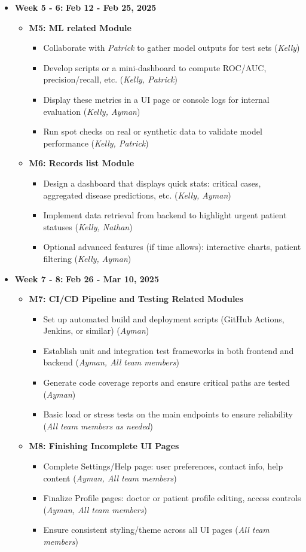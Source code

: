\documentclass[12pt, titlepage]{article}
\newcommand{\rt}[1]{\textbf{#1}}
\begin{document}
\begin{itemize}
\item \textbf{Week 5 - 6:} \rt{Feb 12 - Feb 25, 2025} \begin{itemize} \item \textbf{M5: ML related Module} \begin{itemize} \item Collaborate with \textit{Patrick} to gather model outputs for test sets (\textit{Kelly}) \item Develop scripts or a mini-dashboard to compute ROC/AUC, precision/recall, etc. (\textit{Kelly, Patrick}) \item Display these metrics in a UI page or console logs for internal evaluation (\textit{Kelly, Ayman}) \item Run spot checks on real or synthetic data to validate model performance (\textit{Kelly, Patrick}) \end{itemize} \item \textbf{M6: Records list Module} \begin{itemize} \item Design a dashboard that displays quick stats: critical cases, aggregated disease predictions, etc. (\textit{Kelly, Ayman}) \item Implement data retrieval from backend to highlight urgent patient statuses (\textit{Kelly, Nathan}) \item Optional advanced features (if time allows): interactive charts, patient filtering (\textit{Kelly, Ayman}) \end{itemize} \end{itemize}

\item \textbf{Week 7 - 8:} \rt{Feb 26 - Mar 10, 2025} \begin{itemize} \item \textbf{M7: CI/CD Pipeline and Testing Related Modules} \begin{itemize} \item Set up automated build and deployment scripts (GitHub Actions, Jenkins, or similar) (\textit{Ayman}) \item Establish unit and integration test frameworks in both frontend and backend (\textit{Ayman, All team members}) \item Generate code coverage reports and ensure critical paths are tested (\textit{Ayman}) \item Basic load or stress tests on the main endpoints to ensure reliability (\textit{All team members as needed}) \end{itemize} \item \textbf{M8: Finishing Incomplete UI Pages} \begin{itemize} \item Complete Settings/Help page: user preferences, contact info, help content (\textit{Ayman, All team members}) \item Finalize Profile pages: doctor or patient profile editing, access controls (\textit{Ayman, All team members}) \item Ensure consistent styling/theme across all UI pages (\textit{All team members}) \end{itemize} \end{itemize}


\end{itemize}
\end{document}

